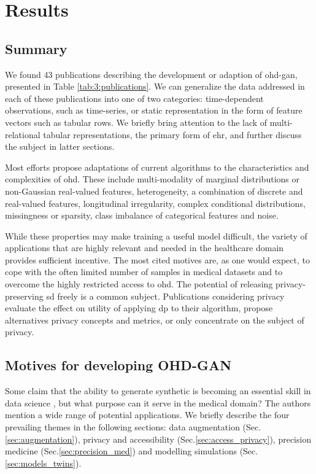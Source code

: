 \section{Results}
    \subsection{Summary}
        We found 43 publications describing the development or adaption of \gls{ohd-gan}, presented in Table \ref{tab:3:publications}. We can generalize the data addressed in each of these publications into one of two categories: time-dependent observations, such as time-series, or static representation in the form of feature vectors such as tabular rows. We briefly bring attention to the lack of multi-relational tabular representations, the primary form of \gls{ehr}, and further discuss the subject in latter sections.\par
        
        Most efforts propose adaptations of current algorithms to the characteristics and complexities of \gls{ohd}. These include multi-modality of marginal distributions or non-Gaussian real-valued features, heterogeneity, a combination of discrete and real-valued features, longitudinal irregularity, complex conditional distributions, missingness or sparsity, class imbalance of categorical features and noise.\par 
        
        While these properties may make training a useful model difficult, the variety of applications that are highly relevant and needed in the healthcare domain provides sufficient incentive. The most cited motives are, as one would expect, to cope with the often limited number of samples in medical datasets and to overcome the highly restricted access to \gls{ohd}. The potential of releasing privacy-preserving \gls{sd} freely is a common subject. Publications considering privacy evaluate the effect on utility of applying \gls{dp} to their algorithm, propose alternatives privacy concepts and metrics, or only concentrate on the subject of privacy.\par
        
    \subsection{Motives for developing OHD-GAN}
        Some claim that the ability to generate synthetic is becoming an essential skill in data science \cite{Sarkar2018}, but what purpose can it serve in the medical domain? The authors mention a wide range of potential applications. We briefly describe the four prevailing themes in the following sections: data augmentation (Sec.\ref{sec:augmentation}), privacy and accessibility (Sec.\ref{sec:access_privacy}), precision medicine (Sec.\ref{sec:precision_med}) and  modelling simulations (Sec.\ref{sec:models_twins}). 

